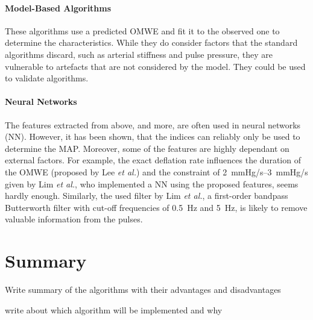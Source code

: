 \paragraph{Model-Based Algorithms} These algorithms use a predicted OMWE and fit it to the observed one to determine the characteristics. While they do consider factors that the standard algorithms discard, such as arterial stiffness and pulse pressure, they are vulnerable to artefacts that are not considered by the model. They could be used to validate algorithms. \cite{Babbs2012}

\paragraph{Neural Networks} The features extracted from above, and more, are often used in neural networks (NN). However, it has been shown, that the indices can reliably only be used to determine the MAP. Moreover, some of the features are highly dependant on external factors. For example, the exact deflation rate influences the duration of the OMWE (proposed by Lee \textit{et al.}\cite{Lee2013}) and the constraint of \SIrange{2}{3}{\mmHg/\second} given by Lim \textit{et al.}\cite{Lim2015}, who implemented a NN using the proposed features, seems hardly enough. Similarly, the used filter by Lim \textit{et al.}, a first-order bandpass Butterworth filter with cut-off frequencies of \SI{0.5}{\Hz} and \SI{5}{\Hz}, is likely to remove valuable information from the pulses.

\section{Summary}
Write summary of the algorithms with their advantages and disadvantages

write about which algorithm will be implemented and why
